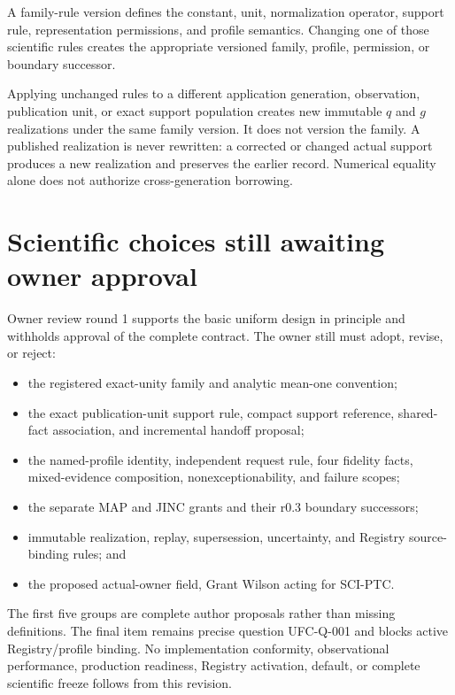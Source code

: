 A family-rule version defines the constant, unit, normalization operator,
support rule, representation permissions, and profile semantics. Changing one
of those scientific rules creates the appropriate versioned family, profile,
permission, or boundary successor.

Applying unchanged rules to a different application generation, observation,
publication unit, or exact support population creates new immutable \(q\) and
\(g\) realizations under the same family version. It does not version the
family. A published realization is never rewritten: a corrected or changed
actual support produces a new realization and preserves the earlier record.
Numerical equality alone does not authorize cross-generation borrowing.

\section{Scientific choices still awaiting owner approval}

Owner review round 1 supports the basic uniform design in principle and
withholds approval of the complete contract. The owner still must adopt,
revise, or reject:

\begin{itemize}
\item the registered exact-unity family and analytic mean-one convention;
\item the exact publication-unit support rule, compact support reference,
shared-fact association, and incremental handoff proposal;
\item the named-profile identity, independent request rule, four fidelity
facts, mixed-evidence composition, nonexceptionability, and failure scopes;
\item the separate MAP and JINC grants and their r0.3 boundary successors;
\item immutable realization, replay, supersession, uncertainty, and Registry
source-binding rules; and
\item the proposed actual-owner field, Grant Wilson acting for SCI-PTC.
\end{itemize}

The first five groups are complete author proposals rather than missing
definitions. The final item remains precise question UFC-Q-001 and blocks
active Registry/profile binding. No implementation conformity, observational
performance, production readiness, Registry activation, default, or complete
scientific freeze follows from this revision.

